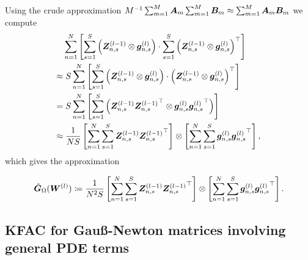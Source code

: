 Using the crude approximation $M^{-1}\sum_{m=1}^M {\bm{A}}_m\sum_{m=1}^M {\bm{B}}_m \approx \sum_{m=1}^M {\bm{A}}_m {\bm{B}}_m$ we compute 
\begin{align*}
    & \sum_{n=1}^N
    \left[\sum_{s=1}^S \left( {\bm{Z}}^{(l-1)}_{n,s}\otimes {\bm{g}}_{n,s}^{(l)} \right)
    \cdot
    \sum_{s=1}^S \left( {\bm{Z}}
    ^{(l-1)}_{n,s}\otimes {\bm{g}}_{n,s}^{(l)} \right)^\top\right]
    \\ \approx & \;
    S\sum_{n=1}^N
    \left[\sum_{s=1}^S \left( {\bm{Z}}^{(l-1)}_{n,s}\otimes {\bm{g}}_{n,s}^{(l)} \right)
    \cdot
    \left( {\bm{Z}}
    ^{(l-1)}_{n,s}\otimes {\bm{g}}_{n,s}^{(l)} \right)^\top\right]
    \\ = & \;
    S\sum_{n=1}^N
    \left[\sum_{s=1}^S \left( {\bm{Z}}^{(l-1)}_{n,s}{{\bm{Z}}
    ^{(l-1)}_{n,s}}^\top\otimes {\bm{g}}_{n,s}^{(l)}{{\bm{g}}_{n,s}^{(l)}}^\top \right)
    \right]
    \\ \approx & \;
    \frac{1}{NS}\left[\sum_{n=1}^N \sum_{s=1}^S {\bm{Z}}^{(l-1)}_{n,s}{{\bm{Z}}^{(l-1)}_{n,s}}^\top \right]
    \otimes
    \left[\sum_{n=1}^N\sum_{s=1}^S {\bm{g}}^{(l)}_{n,s}{{\bm{g}}^{(l)}_{n,s}}^\top \right],
\end{align*}
which gives the approximation 
\begin{tcolorbox}[colframe=kfac, title={KFAC for Gauß-Newton with the Laplace operator},bottom=0mm,top=0mm,middle=0mm]
\begin{align*}\label{eq:KFAC-PINN}
    \hat{\mG}_\Omega%
    (\mW^{(l)})
    \coloneqq \frac{1}{N^2 S}
    \left[\sum_{n=1}^N \sum_{s=1}^S \mZ^{(l-1)}_{n,s}{\mZ^{(l-1)}_{n,s}}^\top \right]
    \otimes
    \left[\sum_{n=1}^N\sum_{s=1}^S \vg^{(l)}_{n,s}{\vg^{(l)}_{n,s}}^\top \right].
\end{align*}
\end{tcolorbox}

\subsection{KFAC for Gauß-Newton matrices involving general PDE terms}

